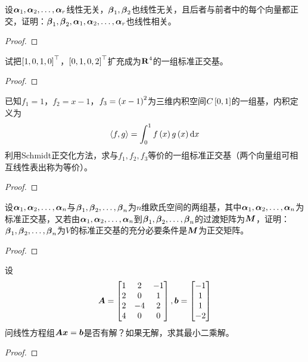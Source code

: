 \begin{problem}
设\(\enums{\vecal}{r}\)线性无关，\(\vecbeta_1,\vecbeta_2\)也线性无关，且后者与前者中的每个向量都正交，证明：\(\vecbeta_1,\vecbeta_2,\enums{\vecal}{r}\)也线性相关。
\end{problem}
\begin{proof}

\end{proof}

\begin{problem}
试把\(\mat{1,0,1,0}^\top\)，\(\mat{0,1,0,2}^\top\)扩充成为\(\rea^4\)的一组标准正交基。
\end{problem}
\begin{proof}

\end{proof}

\begin{problem}
已知\(f_1=1\)，\(f_2=x-1\)，\(f_3=\mypar{x-1}^2\)为三维内积空间\(C\mat{0,1}\)的一组基，内积定义为
\begin{equation*}
    \indot{f}{g}=\int_0^1f\mypar{x}g\mypar{x}\mathrm{d}x
\end{equation*}
利用Schmidt正交化方法，求与\(f_1,f_2,f_3\)等价的一组标准正交基（两个向量组可相互线性表出称为等价）。
\end{problem}
\begin{proof}

\end{proof}

\begin{problem}
设\(\enums{\vecal}{n}\)与\(\enums{\vecbeta}{n}\)为\(n\)维欧氏空间的两组基，其中\(\enums{\vecal}{n}\)为标准正交基，又若由\(\enums{\vecal}{n}\)到\(\enums{\vecbeta}{n}\)的过渡矩阵为\(\matm\)，证明：\(\enums{\vecbeta}{n}\)为\(V\)的标准正交基的充分必要条件是\(\matm\)为正交矩阵。
\end{problem}
\begin{proof}

\end{proof}

\setcounter{problem}{25}
\begin{problem}
设
\begin{equation*}
    \mata=
    \begin{bmatrix}
        1 & 2  & -1 \\
        2 & 0  & 1  \\
        2 & -4 & 2  \\
        4 & 0  & 0
    \end{bmatrix},
    \vecb=\begin{bmatrix}-1\\1\\1\\-2\end{bmatrix}
\end{equation*}
问线性方程组\(\mata\vecx=\vecb\)是否有解？如果无解，求其最小二乘解。
\end{problem}
\begin{proof}

\end{proof}

